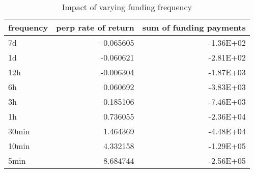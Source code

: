 \begin{table}[!htbp]
\caption{Impact of varying funding frequency}
\label{tbl:funding_frequency}
\begin{tabular}{lrr}
\toprule
frequency & perp rate of return & sum of funding payments \\
\midrule
7d & -0.065605 & -1.36E+02 \\
1d & -0.060621 & -2.81E+02 \\
12h & -0.006304 & -1.87E+03 \\
6h & 0.060692 & -3.83E+03 \\
3h & 0.185106 & -7.46E+03 \\
1h & 0.736055 & -2.36E+04 \\
30min & 1.464369 & -4.48E+04 \\
10min & 4.332158 & -1.29E+05 \\
5min & 8.684744 & -2.56E+05 \\
\bottomrule
\end{tabular}
\end{table}
